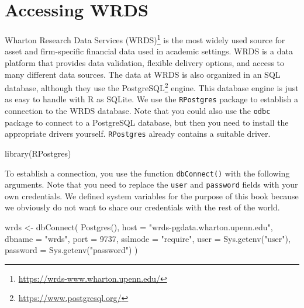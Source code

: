 \documentclass[
]{book}
\newenvironment{Shaded}{\begin{snugshade}}{\end{snugshade}}
\newcommand{\AttributeTok}[1]{\textcolor[rgb]{0.61,0.61,0.61}{#1}}
\newcommand{\DecValTok}[1]{\textcolor[rgb]{0.06,0.06,0.06}{#1}}
\newcommand{\FunctionTok}[1]{\textcolor[rgb]{0,0,0}{#1}}
\newcommand{\NormalTok}[1]{#1}
\newcommand{\OtherTok}[1]{\textcolor[rgb]{0.37,0.37,0.37}{#1}}
\newcommand{\StringTok}[1]{\textcolor[rgb]{0.5,0.5,0.5}{#1}}
\renewcommand{\href}[2]{#2\footnote{\url{#1}}}
\begin{document}
\hypertarget{accessing-wrds}{%
\section{Accessing WRDS}\label{accessing-wrds}}

\href{https://wrds-www.wharton.upenn.edu/}{Wharton Research Data Services (WRDS)} is the most widely used source for asset and firm-specific financial data used in academic settings. WRDS is a data platform that provides data validation, flexible delivery options, and access to many different data sources. The data at WRDS is also organized in an SQL database, although they use the \href{https://www.postgresql.org/}{PostgreSQL} engine. This database engine is just as easy to handle with R as SQLite. We use the \texttt{RPostgres} package to establish a connection to the WRDS database. Note that you could also use the \texttt{odbc} package to connect to a PostgreSQL database, but then you need to install the appropriate drivers yourself. \texttt{RPostgres} already contains a suitable driver.

\begin{Shaded}
\begin{Highlighting}[]
\FunctionTok{library}\NormalTok{(RPostgres)}
\end{Highlighting}
\end{Shaded}

To establish a connection, you use the function \texttt{dbConnect()} with the following arguments. Note that you need to replace the \texttt{user} and \texttt{password} fields with your own credentials. We defined system variables for the purpose of this book because we obviously do not want to share our credentials with the rest of the world.

\begin{Shaded}
\begin{Highlighting}[]
\NormalTok{wrds }\OtherTok{\textless{}{-}} \FunctionTok{dbConnect}\NormalTok{(}
  \FunctionTok{Postgres}\NormalTok{(),}
  \AttributeTok{host =} \StringTok{"wrds{-}pgdata.wharton.upenn.edu"}\NormalTok{,}
  \AttributeTok{dbname =} \StringTok{"wrds"}\NormalTok{,}
  \AttributeTok{port =} \DecValTok{9737}\NormalTok{,}
  \AttributeTok{sslmode =} \StringTok{"require"}\NormalTok{,}
  \AttributeTok{user =} \FunctionTok{Sys.getenv}\NormalTok{(}\StringTok{"user"}\NormalTok{),}
  \AttributeTok{password =} \FunctionTok{Sys.getenv}\NormalTok{(}\StringTok{"password"}\NormalTok{)}
\NormalTok{)}
\end{Highlighting}
\end{Shaded}
\end{document}
